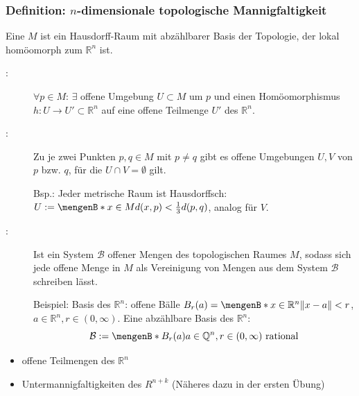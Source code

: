 \subsubsection{Definition: $n$-dimensionale topologische Mannigfaltigkeit}
\label{ssub:121}
Eine  $M$ ist ein 
Hausdorff-Raum mit abzählbarer Basis der Topologie, der lokal homöomorph zum $\mathds{R}^n$ ist.
\begin{description}
	\item[:]  $\forall p \in M :\, \exists$ offene Umgebung $U \subset M$ um $p$ und einen Homöomorphismus $h : U \to U' \subset \mathds{R}^n$  auf 
	eine offene Teilmenge $U'$ des $\mathds{R}^n$. 
	\item[:]  Zu je zwei Punkten $p, q \in M$ mit $p \not= q$ gibt es offene Umgebungen $U,V$ von $p$ bzw. $q$, für die $U \cap V = \emptyset$ gilt.
	
	Bsp.: Jeder metrische Raum ist Hausdorffsch: $U := \set[x \in M]{d(x,p)< \frac{1}{3} d(p,q) } $, analog für $V$. 
	\item[:] Ist ein System $\mathcal{B}$ offener Mengen des topologischen Raumes $M$, sodass sich jede offene Menge in $M$ als 
	Vereinigung von Mengen aus dem System $\mathcal{B}$ schreiben lässt.  
	
	Beispiel: Basis des $\mathds{R}^n$: offene Bälle 
	$B_r(a) = \set[x \in \mathds{R}^n]{\norm{x-a} < r } $, $a \in \mathds{R}^n, r \in (0, \infty)$. Eine abzählbare Basis des $\mathds{R}^n$: 
	\[
		\mathcal{B} := \set[B_r(a)]{a \in \mathds{Q}^n, r \in (0,\infty) \text{ rational}} 
	\]
\end{description}

\begin{itemize}
	\item offene Teilmengen des $\mathds{R}^n$
	\item Untermannigfaltigkeiten des $R^{n+k}$ \hfill {\color{light_gray}(Näheres dazu in der ersten Übung)}
\end{itemize}

